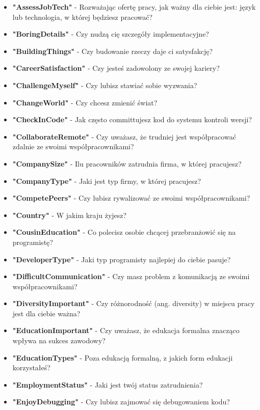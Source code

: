 \begin{appendices}
\begin{itemize}
        \item \textbf{"AssessJobTech"} - Rozważając ofertę pracy, jak ważny dla ciebie jest: język lub technologia, w której będziesz pracować?
        \item \textbf{"BoringDetails"} - Czy nudzą cię szczegóły implementacyjne?
        \item \textbf{"BuildingThings"} - Czy budowanie rzeczy daje ci satysfakcję?
        \item \textbf{"CareerSatisfaction"} - Czy jesteś zadowolony ze swojej kariery?
        \item \textbf{"ChallengeMyself"} - Czy lubisz stawiać sobie wyzwania?
        \item \textbf{"ChangeWorld"} - Czy chcesz zmienić świat?
        \item \textbf{"CheckInCode"} - Jak często committujesz kod do systemu kontroli wersji?
        \item \textbf{"CollaborateRemote"} - Czy uważasz, że trudniej jest współpracować zdalnie ze swoimi współpracownikami?
        \item \textbf{"CompanySize"} - Ilu pracowników zatrudnia firma, w której pracujesz?
        \item \textbf{"CompanyType"} - Jaki jest typ firmy, w której pracujesz?
        \item \textbf{"CompetePeers"} - Czy lubisz rywalizować ze swoimi współpracownikami?
        \item \textbf{"Country"} - W jakim kraju żyjesz?
        \item \textbf{"CousinEducation"} - Co polecisz osobie chcącej przebranżowić się na programistę?
        \item \textbf{"DeveloperType"} - Jaki typ programisty najlepiej do ciebie pasuje?
        \item \textbf{"DifficultCommunication"} - Czy masz problem z komunikacją ze swoimi współpracownikami?
        \item \textbf{"DiversityImportant"} - Czy różnorodność (ang. diversity) w miejscu pracy jest dla ciebie ważna?
        \item \textbf{"EducationImportant"} - Czy uważasz, że edukacja formalna znacząco wpływa na sukces zawodowy?
        \item \textbf{"EducationTypes"} - Poza edukacją formalną, z jakich form edukacji korzystałeś?
        \item \textbf{"EmploymentStatus"} - Jaki jest twój status zatrudnienia?
        \item \textbf{"EnjoyDebugging"} - Czy lubisz zajmować się debugowaniem kodu?

\end{itemize}
\end{appendices}
